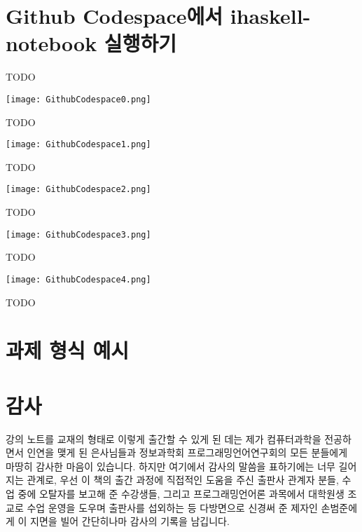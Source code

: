 \printbibliography[title=참고문헌]

\AppendixTitleToToc
\AttachAppendixTitleToSecnum

\appendix
\appendixpage*


\section{Github Codespace에서 ihaskell-notebook 실행하기}
TODO

\begin{center}
\texttt{[image: GithubCodespace0.png]}
\end{center}

TODO

\begin{center}
\texttt{[image: GithubCodespace1.png]}
\end{center}

TODO

\begin{center}
\texttt{[image: GithubCodespace2.png]}
\end{center}

TODO

\begin{center}
\texttt{[image: GithubCodespace3.png]}
\end{center}

TODO

\begin{center}
\texttt{[image: GithubCodespace4.png]}
\end{center}

TODO

\newpage

\section{과제 형식 예시}


\newpage

\section{감사}
강의 노트를 교재의 형태로 이렇게 출간할 수 있게 된 데는 제가 컴퓨터과학을 전공하면서
인연을 맺게 된 은사님들과 정보과학회 프로그래밍언어연구회의 모든 분들에게 마땅히 감사한 마음이 있습니다.
하지만 여기에서 감사의 말씀을 표하기에는 너무 길어지는 관계로,
우선 이 책의 출간 과정에 직접적인 도움을 주신 출판사 관계자 분들,
수업 중에 오탈자를 보고해 준 수강생들, 그리고 프로그래밍언어론 과목에서
대학원생 조교로 수업 운영을 도우며 출판사를 섭외하는 등 다방면으로
신경써 준 제자인 손범준에게 이 지면을 빌어 간단히나마 감사의 기록을 남깁니다.

